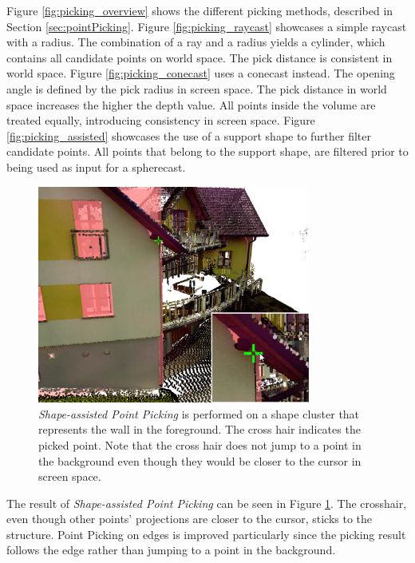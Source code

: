 Figure \ref{fig:picking_overview} shows the different picking methods, described in Section \ref{sec:pointPicking}. Figure \ref{fig:picking_raycast} showcases a simple raycast with a radius. The combination of a ray and a radius yields a cylinder, which contains all candidate points on world space. The pick distance is consistent in world space. Figure \ref{fig:picking_conecast} uses a conecast instead. The opening angle is defined by the pick radius in screen space. The pick distance in world space increases the higher the depth value. All points inside the volume are treated equally, introducing consistency in screen space. Figure \ref{fig:picking_assisted} showcases the use of a support shape to further filter candidate points. All points that belong to the support shape, are filtered prior to being used as input for a spherecast. 


\begin{figure}
    \centering
    \includegraphics[width=0.8\textwidth]{System_Design/picking_assisted_screenshot.png}%
    \caption{\textit{Shape-assisted Point Picking} is performed on a shape cluster that represents the wall in the foreground. The cross hair indicates the picked point. Note that the cross hair does not jump to a point in the background even though they would be closer to the cursor in screen space. }
    \label{fig:picking_assisted_screenshot}
\end{figure}

The result of \textit{Shape-assisted Point Picking} can be seen in Figure \ref{fig:picking_assisted_screenshot}. The crosshair, even though other points' projections are closer to the cursor, sticks to the structure. Point Picking on edges is improved particularly since the picking result follows the edge rather than jumping to a point in the background. 


